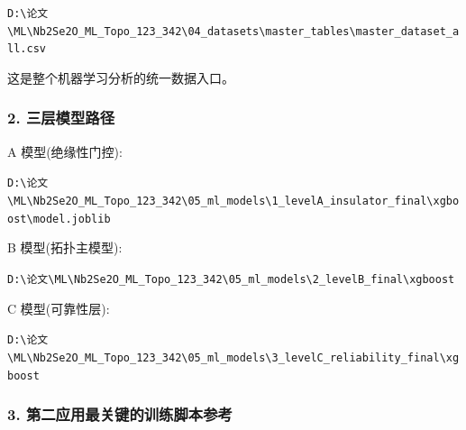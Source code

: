 \documentclass[lang=cn,scheme=chinese,color=blue,device=normal,toc=onecol,math=cm]{elegantbook}
\begin{document}
\texttt{D:\textbackslash{}\allowbreak{}论文\textbackslash{}\allowbreak{}ML\textbackslash{}\allowbreak{}Nb2Se2O\_\allowbreak{}ML\_\allowbreak{}Topo\_\allowbreak{}123\_\allowbreak{}342\textbackslash{}\allowbreak{}04\_\allowbreak{}datasets\textbackslash{}\allowbreak{}master\_\allowbreak{}tables\textbackslash{}\allowbreak{}master\_\allowbreak{}dataset\_\allowbreak{}all.csv}\par


这是整个机器学习分析的统一数据入口。\par


\subsubsection{2. 三层模型路径}


A 模型(绝缘性门控):\par


\texttt{D:\textbackslash{}\allowbreak{}论文\textbackslash{}\allowbreak{}ML\textbackslash{}\allowbreak{}Nb2Se2O\_\allowbreak{}ML\_\allowbreak{}Topo\_\allowbreak{}123\_\allowbreak{}342\textbackslash{}\allowbreak{}05\_\allowbreak{}ml\_\allowbreak{}models\textbackslash{}\allowbreak{}1\_\allowbreak{}levelA\_\allowbreak{}insulator\_\allowbreak{}final\textbackslash{}\allowbreak{}xgboost\textbackslash{}\allowbreak{}model.joblib}\par


B 模型(拓扑主模型):\par


\texttt{D:\textbackslash{}\allowbreak{}论文\textbackslash{}\allowbreak{}ML\textbackslash{}\allowbreak{}Nb2Se2O\_\allowbreak{}ML\_\allowbreak{}Topo\_\allowbreak{}123\_\allowbreak{}342\textbackslash{}\allowbreak{}05\_\allowbreak{}ml\_\allowbreak{}models\textbackslash{}\allowbreak{}2\_\allowbreak{}levelB\_\allowbreak{}final\textbackslash{}\allowbreak{}xgboost}\par


C 模型(可靠性层):\par


\texttt{D:\textbackslash{}\allowbreak{}论文\textbackslash{}\allowbreak{}ML\textbackslash{}\allowbreak{}Nb2Se2O\_\allowbreak{}ML\_\allowbreak{}Topo\_\allowbreak{}123\_\allowbreak{}342\textbackslash{}\allowbreak{}05\_\allowbreak{}ml\_\allowbreak{}models\textbackslash{}\allowbreak{}3\_\allowbreak{}levelC\_\allowbreak{}reliability\_\allowbreak{}final\textbackslash{}\allowbreak{}xgboost}\par


\subsubsection{3. 第二应用最关键的训练脚本参考}
\end{document}
